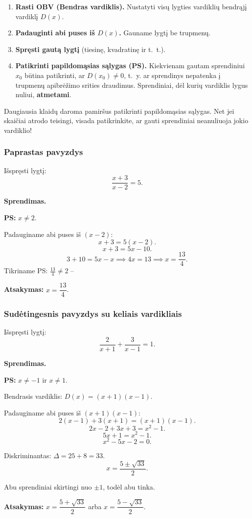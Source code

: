 \begin{enumerate}
    \item \textbf{Rasti OBV (Bendras vardiklis).} Nustatyti visų lygties vardiklių bendrąjį vardiklį $D(x)$.
    \item \textbf{Padauginti abi puses iš $D(x)$.} Gauname lygtį be trupmenų.
    \item \textbf{Spręsti gautą lygtį} (tiesinę, kvadratinę ir t.~t.).
    \item \textbf{Patikrinti papildomąsias sąlygas (PS).} Kiekvienam gautam sprendiniui $x_0$ būtina patikrinti, ar $D(x_0) \neq 0$, t.~y. ar sprendinys nepatenka į trupmenų apibrėžimo srities draudimus. Sprendiniai, dėl kurių vardiklis lygus nuliui, \textbf{atmetami}.
\end{enumerate}

\begin{tcolorbox}[title={Dažna klaida!}, colback=red!5, colframe=red!60]
Daugiausia klaidų daroma pamiršus patikrinti papildomąsias sąlygas. Net jei skaičiai atrodo teisingi, visada patikrinkite, ar gauti sprendiniai neanuliuoja jokio vardiklio!
\end{tcolorbox}

\subsubsection*{Paprastas pavyzdys}

\begin{example}
Išspręsti lygtį:
\[
    \frac{x+3}{x-2} = 5.
\]

\textbf{Sprendimas.}

\textbf{PS:} $x \neq 2$.

Padauginame abi puses iš $(x - 2)$:
\[
    x + 3 = 5(x - 2).
\]
\[
    x + 3 = 5x - 10.
\]
\[
    3 + 10 = 5x - x \implies 4x = 13 \implies x = \frac{13}{4}.
\]
Tikriname PS: $\frac{13}{4} \neq 2$ -- \checkmark

\textbf{Atsakymas:} $x = \dfrac{13}{4}$.
\end{example}

\subsubsection*{Sudėtingesnis pavyzdys su keliais vardikliais}

\begin{example}
Išspręsti lygtį:
\[
    \frac{2}{x+1} + \frac{3}{x-1} = 1.
\]

\textbf{Sprendimas.}

\textbf{PS:} $x \neq -1$ ir $x \neq 1$.

Bendrasis vardiklis: $D(x) = (x+1)(x-1)$.

Padauginame abi puses iš $(x+1)(x-1)$:
\[
    2(x-1) + 3(x+1) = (x+1)(x-1).
\]
\[
    2x - 2 + 3x + 3 = x^2 - 1.
\]
\[
    5x + 1 = x^2 - 1.
\]
\[
    x^2 - 5x - 2 = 0.
\]

Diskriminantas: $\Delta = 25 + 8 = 33$.
\[
    x = \frac{5 \pm \sqrt{33}}{2}.
\]

Abu sprendiniai skirtingi nuo $\pm 1$, todėl abu tinka.

\textbf{Atsakymas:} $x = \dfrac{5 + \sqrt{33}}{2}$ arba $x = \dfrac{5 - \sqrt{33}}{2}$.
\end{example}

